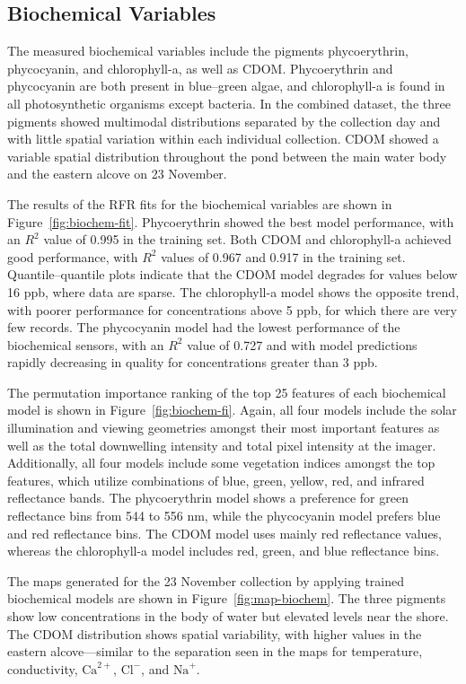 \documentclass[remotesensing,article,accept,pdftex,moreauthors]{Definitions/mdpi}
\begin{document}
\subsection{Biochemical Variables}

The measured biochemical variables include the pigments phycoerythrin, phycocyanin, and chlorophyll-a, as well as CDOM. Phycoerythrin and phycocyanin are both present in blue--green algae, and chlorophyll-a is found in all photosynthetic organisms except bacteria. In the combined dataset, the three pigments showed multimodal distributions separated by the collection day and with little spatial variation within each individual collection. CDOM showed a variable spatial distribution throughout the pond between the main water body and the eastern alcove on 23 November.

The results of the RFR fits for the biochemical variables are shown in Figure~\ref{fig:biochem-fit}. Phycoerythrin showed the best model performance, with an $R^2$ value of 0.995 in the training set. Both CDOM and chlorophyll-a achieved good performance, with $R^2$ values of 0.967 and 0.917 in the training set. Quantile--quantile plots indicate that the CDOM model degrades for values below 16 ppb, where data are sparse. The chlorophyll-a model shows the opposite trend, with poorer performance for concentrations above 5 ppb, for which there are very few records. The phycocyanin model had the lowest performance of the biochemical sensors, with an $R^2$ value of 0.727 and with model predictions rapidly decreasing in quality for concentrations greater than 3 ppb. 

The permutation importance ranking of the top 25 features of each biochemical model is shown in Figure~\ref{fig:biochem-fi}. Again, all four models include the solar illumination and viewing geometries amongst their most important features as well as the total downwelling intensity and total pixel intensity at the imager. Additionally, all four models include some vegetation indices amongst the top features, which utilize combinations of blue, green, yellow, red, and infrared reflectance bands. The phycoerythrin model shows a preference for green reflectance bins from 544 to 556 nm, while the phycocyanin model prefers blue and red reflectance bins. The CDOM model uses mainly red reflectance values, whereas the chlorophyll-a model includes red, green, and blue reflectance bins.

The maps generated for the 23 November collection by applying trained biochemical models are shown in Figure~\ref{fig:map-biochem}. The three pigments show low concentrations in the body of water but elevated levels near the shore. The CDOM distribution shows spatial variability, with higher values in the eastern alcove---similar to the separation seen in the maps for temperature, conductivity, $\textrm{Ca}^{2+}$, $\textrm{Cl}^{-}$, and $\textrm{Na}^{+}$.
\end{document}
